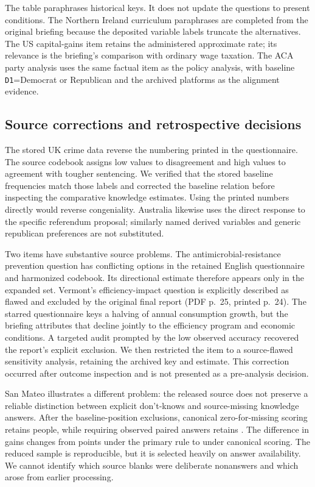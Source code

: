 The table paraphrases historical keys. It does not update the questions to present conditions. The Northern Ireland curriculum paraphrases are completed from the original briefing because the deposited variable labels truncate the alternatives. The US capital-gains item retains the administered approximate rate; its relevance is the briefing's comparison with ordinary wage taxation. The ACA party analysis uses the same factual item as the policy analysis, with baseline \texttt{D1}=Democrat or Republican and the archived platforms as the alignment evidence.

{\small{}

}

\subsection{Source corrections and retrospective decisions}

The stored UK crime data reverse the numbering printed in the questionnaire. The source codebook assigns low values to disagreement and high values to agreement with tougher sentencing. We verified that the stored baseline frequencies match those labels and corrected the baseline relation before inspecting the comparative knowledge estimates. Using the printed numbers directly would reverse congeniality. Australia likewise uses the direct response to the specific referendum proposal; similarly named derived variables and generic republican preferences are not substituted.

Two items have substantive source problems. The antimicrobial-resistance prevention question has conflicting options in the retained English questionnaire and harmonized codebook. Its directional estimate therefore appears only in the expanded set. Vermont's efficiency-impact question is explicitly described as flawed and excluded by the original final report (PDF p.~25, printed p.~24). The starred questionnaire keys a halving of annual consumption growth, but the briefing attributes that decline jointly to the efficiency program and economic conditions. A targeted audit prompted by the low observed accuracy recovered the report's explicit exclusion. We then restricted the item to a source-flawed sensitivity analysis, retaining the archived key and estimate. This correction occurred after outcome inspection and is not presented as a pre-analysis decision.

San Mateo illustrates a different problem: the released source does not preserve a reliable distinction between explicit don't-knows and source-missing knowledge answers. After the baseline-position exclusions, canonical zero-for-missing scoring retains \sanMateoCanonicalN{} people, while requiring observed paired answers retains \sanMateoN{}. The difference in gains changes from \sanMateoDiff{} points under the primary rule to \sanMateoCanonicalDiff{} under canonical scoring. The reduced sample is reproducible, but it is selected heavily on answer availability. We cannot identify which source blanks were deliberate nonanswers and which arose from earlier processing.

